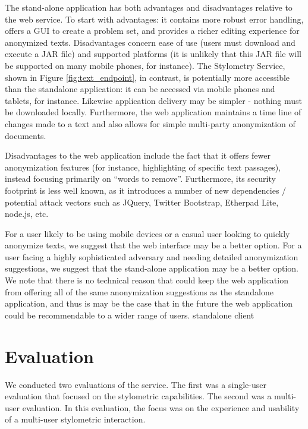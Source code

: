 \documentclass[letterpaper]{article}
\begin{document}
The stand-alone application has both advantages and disadvantages
relative to the web service. To start with advantages: it contains
more robust error handling, offers a GUI to create a problem set, and
provides a richer editing experience for anonymized
texts. Disadvantages concern ease of use (users must download and
execute a JAR file) and supported platforms (it is unlikely that this
JAR file will be supported on many mobile phones, for instance). The
Stylometry Service, shown in Figure \ref{fig:text_endpoint}, in
contrast, is potentially more accessible than the standalone
application: it can be accessed via mobile phones and tablets, for
instance. Likewise application delivery may be simpler - nothing must
be downloaded locally. Furthermore, the web application maintains a
time line of changes made to a text and also allows for simple
multi-party anonymization of documents.

Disadvantages to the web application include the fact that it offers
fewer anonymization features (for instance, highlighting of specific
text passages), instead focusing primarily on ``words to
remove''. Furthermore, its security footprint is less well known, as it
introduces a number of new dependencies / potential attack vectors
such as JQuery, Twitter Bootstrap, Etherpad Lite, node.js, etc.

For a user likely to be using mobile devices or a casual user looking
to quickly anonymize texts, we suggest that the web interface may be a
better option. For a user facing a highly sophisticated adversary and
needing detailed anonymization suggestions, we suggest that the
stand-alone application may be a better option. We note that there is
no technical reason that could keep the web application from offering
all of the same anonymization suggestions as the standalone
application, and thus is may be the case that in the future the web
application could be recommendable to a wider range of users.
standalone client

\section{Evaluation}\label{sec:evaluation}

We conducted two evaluations of the service.  The first was a
single-user evaluation that focused on the stylometric capabilities.
The second was a multi-user evaluation.  In this evaluation, the focus
was on the experience and usability of a multi-user stylometric
interaction.
\end{document}
